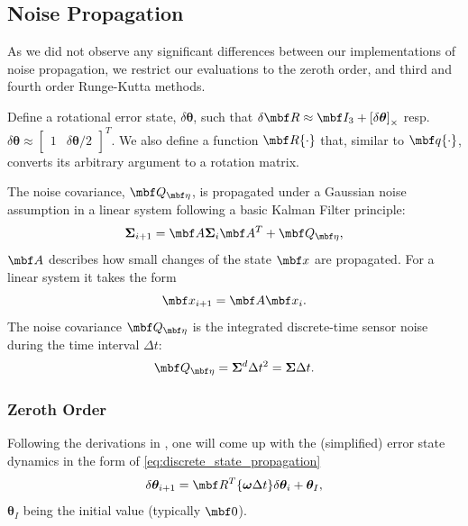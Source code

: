 \documentclass[10pt,a4paper]{article}
\newcommand{\mbs}[1]{{\boldsymbol{#1}}}
\numberwithin{equation}{section}
\begin{document}
\subsection{Noise Propagation}
As we did not observe any significant differences between our implementations of noise propagation, we restrict our evaluations to the zeroth order, and third and fourth order Runge-Kutta methods. 

Define a rotational error state, $\delta \mbs \theta$, such that $\delta \mbf R \approx \mbf I_3 + \left[ \delta \mbs \theta \right]_\times$ resp. $\delta \mbs \theta \approx \begin{bmatrix}
1 & \delta \mbs \theta / 2
\end{bmatrix}^T$. We also define a function $\mbf R \lbrace \cdot \rbrace$ that, similar to $\mbf q \lbrace \cdot \rbrace$, converts its arbitrary argument to a rotation matrix.

The noise covariance, $\mbf Q_{\mbf \eta}$, is propagated under a Gaussian noise assumption in a linear system following a basic Kalman Filter principle:
\begin{equation}
\mbs \Sigma_{i+1} = \mbf A \mbs \Sigma_i \mbf A^T + \mbf Q_{\mbf \eta},
\end{equation}
$\mbf A$ describes how small changes of the state $\mbf x$ are propagated. For a linear system it takes the form 
\begin{equation}
\mbf x_{i+1} = \mbf A \mbf x_i.
\label{eq:discrete_state_propagation}
\end{equation}
The noise covariance $\mbf Q_{\mbf \eta}$ is the integrated discrete-time sensor noise during the time interval $\Delta t$:
\begin{equation}
\mbf Q_{\mbf \eta} = \mbs \Sigma^d \Delta t^2 = \mbs \Sigma \Delta t.
\label{eq:integrated_noise_covariance}
\end{equation}

\subsubsection{Zeroth Order}
Following the derivations in \cite{joan_sola}, one will come up with the (simplified) error state dynamics in the form of \eqref{eq:discrete_state_propagation}
\begin{equation}
\delta \mbs \theta_{i+1} = \mbf R^T \lbrace \mbs \omega \Delta t \rbrace
\delta  \mbs \theta_i + \mbs \theta_I,
\end{equation}
$\mbs \theta_I$ being the initial value (typically $\mbf 0$).
\end{document}
